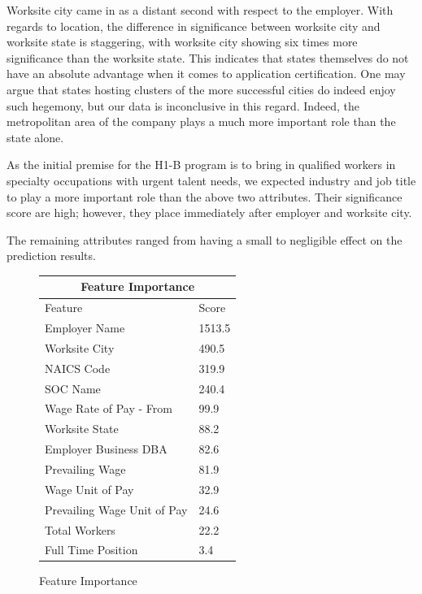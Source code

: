 \documentclass[sigconf]{acmart}
\begin{document}
Worksite city came in as a distant second with respect to the employer. 
With regards to location, the difference in significance between worksite city 
and worksite state is staggering, with worksite city showing six times more significance 
than the worksite state. This indicates that states themselves do not have an absolute advantage 
when it comes to application certification. One may argue that states hosting clusters of 
the more successful cities do indeed enjoy such hegemony, but our data is inconclusive in this regard.
Indeed, the metropolitan area of the company plays a much more important role than the state alone. 


As the initial premise for the H1-B program is to bring in qualified workers in specialty occupations with urgent 
talent needs, we expected industry and job title to play a more important role than the above two attributes. Their significance 
score are high; however, they place immediately after employer and worksite city. 


The remaining attributes ranged from having a small to negligible effect on the prediction results. 


\begin{figure}
  \begin{tabular}{ |p{4cm}||p{2cm}|  }
    \hline
    \multicolumn{2}{|c|}{\textbf{Feature Importance}} \\
    \hline
    Feature & Score\\
    \hline
    Employer Name & 1513.5\\
    Worksite City & 490.5\\
    NAICS Code & 319.9\\
    SOC Name & 240.4\\
    Wage Rate of Pay - From & 99.9\\
    Worksite State & 88.2\\
    Employer Business DBA & 82.6\\
    Prevailing Wage & 81.9\\
    Wage Unit of Pay & 32.9\\
    Prevailing Wage Unit of Pay & 24.6\\
    Total Workers & 22.2\\
    Full Time Position & 3.4\\
    \hline
   \end{tabular}
  \caption{Feature Importance}
   \label{fig:featureimportance}
\end{figure}
\end{document}
